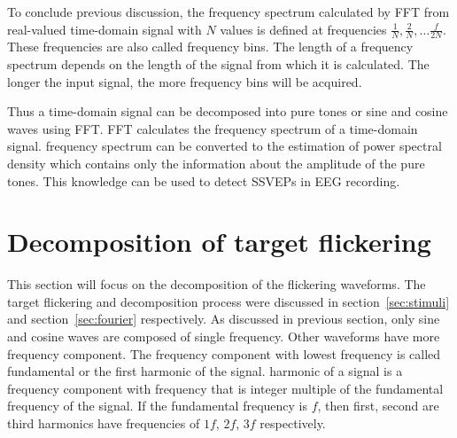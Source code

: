 To conclude previous discussion, the \gls{frequency spectrum} calculated by \gls{FFT} from real-valued time-domain signal with $N$ values is defined at frequencies $\frac{1}{N}, \frac{2}{N}, \dots\frac{f}{2N}$. These frequencies are also called \glspl{frequency bin}. The length of a \gls{frequency spectrum} depends on the length of the signal from which it is calculated. The longer the input signal, the more \glspl{frequency bin} will be acquired.

Thus a time-domain signal can be decomposed into \glspl{pure tone} or sine and cosine waves using \gls{FFT}. \gls{FFT} calculates the \gls{frequency spectrum} of a time-domain signal. \Gls{frequency spectrum} can be converted to the estimation of \gls{power spectral density} which contains only the information about the amplitude of the \glspl{pure tone}. This knowledge can be used to detect \glspl{SSVEP} in \gls{EEG} recording.



\section{Decomposition of target flickering}

This section will focus on the decomposition of the \glspl{flickering waveform}. The \gls{target} \gls{flickering} and decomposition process were discussed in section~\ref{sec:stimuli} and section~\ref{sec:fourier} respectively. As discussed in previous section, only sine and cosine waves are composed of single frequency. Other waveforms have more \gls{frequency component}. The \gls{frequency component} with lowest frequency is called \gls{fundamental} or the first \gls{harmonic} of the signal. \Gls{harmonic} of a signal is a \gls{frequency component} with frequency that is integer multiple of the \gls{fundamental} frequency of the signal. If the \gls{fundamental} frequency is $f$, then first, second are third \glspl{harmonic} have frequencies of $1f$, $2f$, $3f$ respectively.

